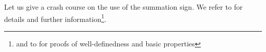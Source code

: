\documentclass[paper=a4, fontsize=12pt]{scrartcl} %
\theoremstyle{plainsl}
\theoremstyle{definition}
\theoremstyle{remark}
\begin{document}
Let us give a crash course on the use of the summation sign.
We refer to \cite[Section 1.4]{detnotes}
for details and further information\footnote{and to
\cite[Section 2.14]{detnotes} for proofs of well-definedness
and basic properties}.
\end{document}

